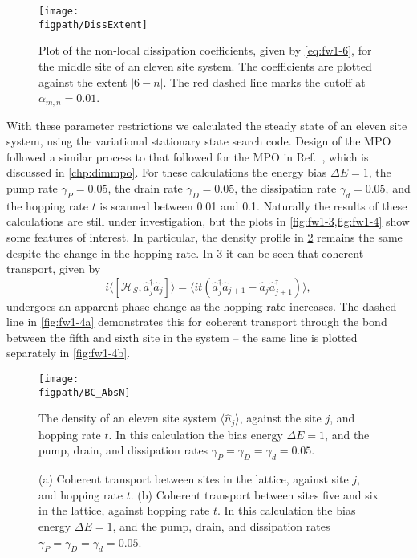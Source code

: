 \begin{figure}[ht!]
	\centering
	\texttt{[image: \\figpath/DissExtent]}
	\caption{\label{fig:fw1-2}Plot of the non-local dissipation coefficients, given by \cref{eq:fw1-6}, for the middle site of an eleven site system. The coefficients are plotted against the extent \(|6-n|\). The red dashed line marks the cutoff at \(\alpha_{m,n} = 0.01\).}
\end{figure}

With these parameter restrictions we calculated the steady state of an eleven site system, using the variational stationary state search code. Design of the MPO followed a similar process to that followed for the MPO in Ref.~\cite{Owen2017}, which is discussed in \cref{chp:dimmpo}. For these calculations the energy bias \(\Delta E = 1\), the pump rate \(\gamma_{P} = 0.05\), the drain rate \(\gamma_{D} = 0.05\), the dissipation rate \(\gamma_{d} = 0.05\), and the hopping rate \(t\) is scanned between 0.01 and 0.1. Naturally the results of these calculations are still under investigation, but the plots in \cref{fig:fw1-3,fig:fw1-4} show some features of interest. In particular, the density profile in \cref{fig:fw1-3} remains the same despite the change in the hopping rate. In \cref{fig:fw1-4} it can be seen that coherent transport, given by
\begin{equation}
	i\langle [\mathcal{H}_{S}, \hat{a}_{j}^{\dagger}\hat{a}_{j}] \rangle =  \langle it \left(\hat{a}_{j}^{\dagger}\hat{a}_{j+1} - \hat{a}_{j}\hat{a}_{j+1}^{\dagger}\right) \rangle,
	\label{eq:fw1-8}  
\end{equation} 
undergoes an apparent phase change as the hopping rate increases. The dashed line in \cref{fig:fw1-4a} demonstrates this for coherent transport through the bond between the fifth and sixth site in the system -- the same line is plotted separately in \cref{fig:fw1-4b}.
 
\begin{figure}[ht!]
	\centering
	\texttt{[image: \\figpath/BC\_AbsN]}
	\caption{\label{fig:fw1-3}The density of an eleven site system \(\langle \hat{n}_{j} \rangle\), against the site \(j\), and hopping rate \(t\). In this calculation the bias energy \(\Delta E = 1\), and the pump, drain, and dissipation rates \(\gamma_{P} = \gamma_{D} = \gamma_{d} = 0.05\).}
\end{figure}

\begin{figure}[ht!]
	 \hfill
	\caption{\label{fig:fw1-4}(a) Coherent transport between sites in the lattice, against site \(j\), and hopping rate \(t\). (b) Coherent transport between sites five and six in the lattice, against hopping rate \(t\). In this calculation the bias energy \(\Delta E = 1\), and the pump, drain, and dissipation rates \(\gamma_{P} = \gamma_{D} = \gamma_{d} = 0.05\).}
\end{figure}

